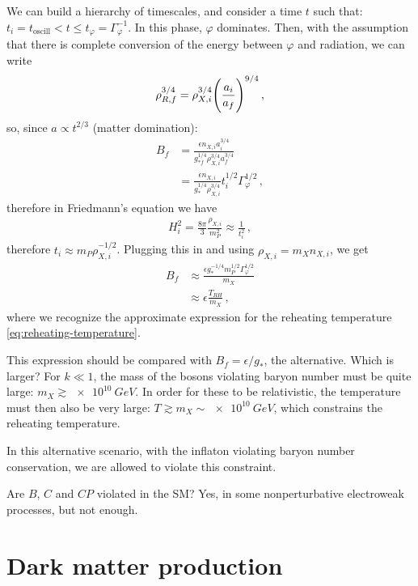 \documentclass[main.tex]{subfiles}
\begin{document}
We can build a hierarchy of timescales, and consider a time \(t\) such that: \(t_i = t _{\text{oscill}} < t \leq t_\varphi = \Gamma _\varphi^{-1}\). 
In this phase, \(\varphi \) dominates.
Then, with the assumption that there is complete conversion of the energy between \(\varphi \) and radiation, we can write 
%
\begin{align}
\rho_{R, f}^{3/4} = \rho _{X, i}^{3/4} \qty(\frac{a_i}{a_f})^{9/4}
\,,
\end{align}
%
so, since \(a \propto t^{2/3}\) (matter domination):
%
\begin{align}
B_f &= \frac{\epsilon n_{X, i} a_i^{3/4}}{g_{*f}^{1/4} \rho _{X, i}^{3/4} a_f^{3/4}}  \\
&= \frac{\epsilon n_{X, i}}{g_*^{1/4} \rho _{X, i}^{3/4}} t_i^{1/2} \Gamma _\varphi^{1/2}
\,,
\end{align}
%
therefore in Friedmann's equation we have
%
\begin{align}
H_i^2 = \frac{8 \pi }{3} \frac{\rho_{X,i}}{m_P^2 } \approx \frac{1}{t_i^2}
\,,
\end{align}
%
therefore \(t_i \approx m_P \rho _{X, i}^{-1/2}\).
Plugging this in and using \(\rho _{X, i} = m_X n_{X, i}\), we get 
%
\begin{align}
B_f &\approx \frac{\epsilon g_*^{-1/4} m_P^{1/2} \Gamma _\varphi^{1/2}}{m_X}  \\
&\approx \epsilon \frac{T_{RH}}{m_X}
\,,
\end{align}
%
where we recognize the approximate expression for the reheating temperature \eqref{eq:reheating-temperature}.

This expression should be compared with \(B_f = \epsilon / g_*\), the alternative. Which is larger?
For \(k \ll 1\), the mass of the bosons violating baryon number must be quite large: \(m_X \gtrsim \SI{e10}{GeV}\). 
In order for these to be relativistic, the temperature must then also be very large: \(T \gtrsim m_X \sim \SI{e10}{GeV}\), which constrains the reheating temperature. 

In this alternative scenario, with the inflaton violating baryon number conservation, we are allowed to violate this constraint. 

Are \(B\), \(C\) and \(CP\) violated in the SM? Yes, in some nonperturbative electroweak processes, but not enough. 

\section{Dark matter production}
\end{document}
